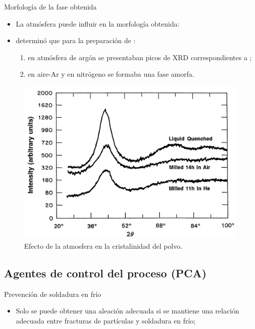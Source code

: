 \documentclass[%
spanish,
progressbar=head,
subsectionpage,
aspectratio=169
]{beamer}
\begin{document}
\begin{frame}{Morfología de la fase obtenida}
    \begin{itemize}
        \item La atmósfera puede influir en la morfología obtenida:
        \item \textcite{oginoNonequilibriumPhasesFormed1990} determinó que para la preparación de : 
        \begin{enumerate}
            \item en atmósfera de argón se presentaban picos de XRD correspondientes a ;
            \item en aire-Ar y en nitrógeno se formaba una fase amorfa.
        \end{enumerate}
    \end{itemize}
\end{frame}

\begin{frame}
    \begin{figure}
        \centering
        \includegraphics[height=0.8\pageheight]{figuras/Koch1995-XRD-a.png}
        \caption{Efecto de la atmosfera en la cristalinidad del polvo.}
    \end{figure}
\end{frame}

\subsection{Agentes de control del proceso (PCA)}

\begin{frame}{Prevención de soldadura en frío}
    \begin{itemize}
        \item Solo se puede obtener una aleación adecuada si se mantiene una relación adecuada entre fracturas de partículas y soldadura en frío;
    \end{itemize}
\end{frame}
\end{document}

